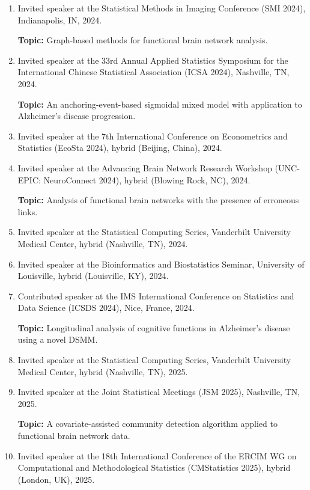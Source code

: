 \documentclass[12pt]{article}
\begin{document}
\begin{enumerate}
		\item Invited speaker at the Statistical Methods in Imaging 
		Conference (SMI 2024), Indianapolis, IN, 2024. 
		
		\textbf{Topic:} Graph-based methods for functional brain 
		network analysis.
		
		\item Invited speaker at the 33rd Annual Applied Statistics 
		Symposium for the International Chinese Statistical 
		Association (ICSA 2024), Nashville, TN, 2024. 
		
		\textbf{Topic:} An anchoring-event-based 
		sigmoidal mixed model with application to Alzheimer's disease 
		progression.
		
		\item Invited speaker at the 7th International Conference on 
		Econometrics and Statistics (EcoSta 2024), hybrid (Beijing, 
		China), 2024.
		
		\item Invited speaker at the Advancing Brain Network 
		Research Workshop (UNC-EPIC: NeuroConnect 2024), hybrid 
		(Blowing Rock, NC), 2024.
		
		\textbf{Topic:} Analysis of functional brain networks with the
		presence of erroneous links.
		
		\item Invited speaker at the Statistical Computing Series, 
		Vanderbilt University Medical Center, hybrid (Nashville, 
		TN), 2024. 
		
		\item Invited speaker at the Bioinformatics and 
		Biostatistics Seminar, University of Louisville, hybrid 
		(Louisville, KY), 2024.
		
		\item Contributed speaker at the IMS International 
		Conference on Statistics and Data Science (ICSDS 2024), 
		Nice, France, 2024.
		
		\textbf{Topic:} Longitudinal analysis of cognitive functions 
		in Alzheimer’s disease using a novel DSMM.
		
		\item Invited speaker at the Statistical Computing Series, 
		Vanderbilt University Medical Center, hybrid (Nashville, 
		TN), 2025. 
		
		\item Invited speaker at the Joint Statistical Meetings (JSM 
		2025), Nashville, TN, 2025.	
		
		\textbf{Topic:} A covariate-assisted community detection 
		algorithm applied to functional brain network data.
		
		\item Invited speaker at the 18th International Conference 
		of the ERCIM WG on Computational and Methodological 
		Statistics (CMStatistics 2025), hybrid (London, UK), 
		2025.
	\end{enumerate}
	
\end{document}
